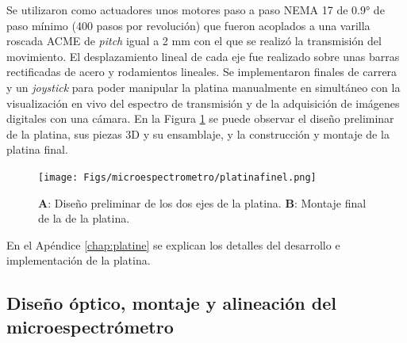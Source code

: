 Se utilizaron como actuadores unos motores paso a paso NEMA 17 de 0.9° de paso mínimo (400 pasos por revolución) que fueron acoplados a una varilla roscada ACME de \textit{pitch} igual a 2 mm con el que se realizó la transmisión del movimiento. El desplazamiento lineal de cada eje fue realizado sobre unas barras rectificadas de acero y rodamientos lineales. Se implementaron finales de carrera y un \textit{joystick} para poder manipular la platina manualmente en simultáneo con la visualización en vivo del espectro de transmisión y de la adquisición de imágenes digitales con una cámara. En la Figura \ref{fig:finalpl} se puede observar el diseño preliminar de la platina, sus piezas 3D y su ensamblaje, y la construcción y montaje de la platina final.
 \begin{figure}[H]
\centering
\texttt{[image: Figs/microespectrometro/platinafinel.png]}	
\caption{\textbf{A}: Diseño preliminar de los dos ejes de la platina. \textbf{B}: Montaje final de la de la platina.}
\label{fig:finalpl}
\end{figure}

En el Apéndice \ref{chap:platine} se explican los detalles del desarrollo e implementación de la platina.


\singlespacing
\subsection{Diseño óptico, montaje y alineación del microespectrómetro}
\label{sec:montalin}

